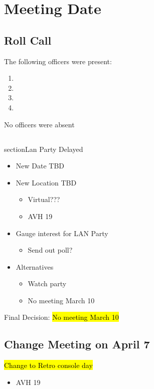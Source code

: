 \section*{Meeting Date}

\subsection{Roll Call}

The following officers were present:

\begin{enumerate}
    \item \president
    \item \tresurer
    \item \primaryprogrammer
    \item \secretary
\end{enumerate}

No officers were absent

\subsection{}section{Lan Party Delayed}
   \begin{itemize}
       \item New Date TBD
       \item New Location TBD
       \begin{itemize}
           \item Virtual???
           \item AVH 19
       \end{itemize}
       \item Gauge interest for LAN Party
       \begin{itemize}
           \item Send out poll?
       \end{itemize}
       \item Alternatives
       \begin{itemize}
           \item Watch party
           \item No meeting March 10
       \end{itemize}
   \end{itemize}
Final Decision: \hl{No meeting March 10}

\subsection{Change Meeting on April 7}
\hl{Change to Retro console day}
   \begin{itemize}
       \item AVH 19
   \end{itemize}

